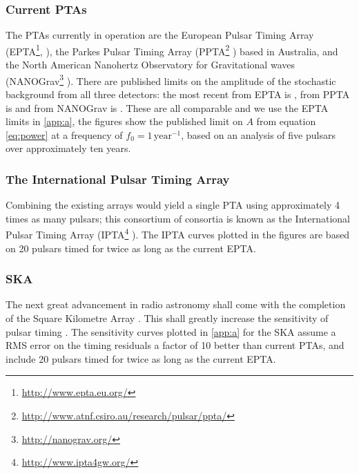 \subsubsection{Current PTAs}

The PTAs currently in operation are the European Pulsar Timing Array (EPTA\footnote{\url{http://www.epta.eu.org/}}, \cite{eptareview2013}), the Parkes Pulsar Timing Array (PPTA\footnote{\url{http://www.atnf.csiro.au/research/pulsar/ppta/}} \cite{parkesreview2013}) based in Australia, and the North American Nanohertz Observatory for Gravitational waves (NANOGrav\footnote{\url{http://nanograv.org/}} \cite{nanogravreview2013}). There are published limits on the amplitude of the stochastic background from all three detectors: the most recent from EPTA is \citet{Haasteren}, from PPTA is \citet{Shannon2013} and from NANOGrav is \citet{Arzoumanian2014}. These are all comparable and we use the EPTA limits in \ref{app:a}, the figures show the published limit on $A$ from equation \ref{eq:power} at a frequency of $f_{0}=1\,\textrm{year}^{-1}$, based on an analysis of five pulsars over approximately ten years.

\subsubsection{The International Pulsar Timing Array}

Combining the existing arrays would yield a single PTA using approximately 4 times as many pulsars; this consortium of consortia is known as the International Pulsar Timing Array (IPTA\footnote{\url{http://www.ipta4gw.org/}} \cite{iptareview2013}). The IPTA curves plotted in the figures are based on 20 pulsars timed for twice as long as the current EPTA.

\subsubsection{SKA}

The next great advancement in radio astronomy shall come with the completion of the Square Kilometre Array \citep[SKA;][]{Dewdney2009}. This shall greatly increase the sensitivity of pulsar timing \citep{Kramer2004}. The sensitivity curves plotted in \ref{app:a} for the SKA assume a RMS error on the timing residuals a factor of 10 better than current PTAs, and include 20 pulsars timed for twice as long as the current EPTA.

